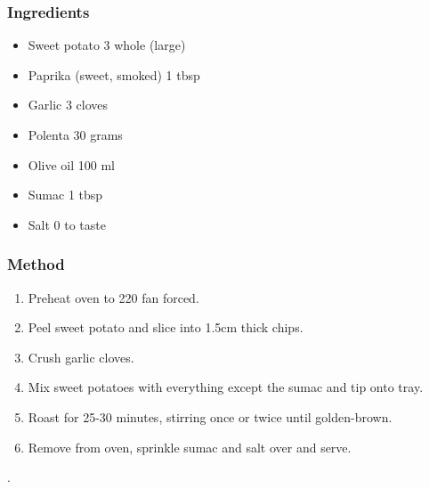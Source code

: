 \documentclass[]{article}
\begin{document}
\subsubsection*{\Large Ingredients}
\begin{multicols}{2}
\begin{itemize}
 \item Sweet potato \hfill 3 whole (large)
 \item Paprika (sweet, smoked) \hfill 1 tbsp
 \item Garlic \hfill 3 cloves
 \item Polenta \hfill 30 grams
 \item Olive oil \hfill 100 ml
 \item Sumac \hfill 1 tbsp
 \item Salt \hfill 0 to taste
\end{itemize}
\end{multicols}
\subsubsection*{\Large Method}
\begin{enumerate}[font=\huge\color{accent}]
	\item Preheat oven to 220 fan forced.
	\item Peel sweet potato and slice into 1.5cm thick chips.
	\item Crush garlic cloves.
	\item Mix sweet potatoes with everything except the sumac and tip onto tray.
	\item Roast for 25-30 minutes, stirring once or twice until golden-brown.
	\item Remove from oven, sprinkle sumac and salt over and serve.
\end{enumerate}
\newpage

\newpage
\color{white}.\color{black}
\vspace{5cm}
\end{document}
